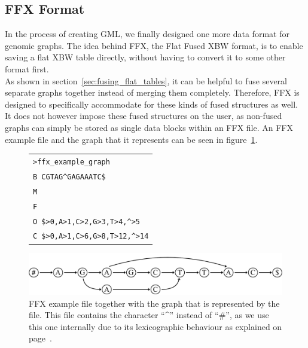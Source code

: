 \documentclass[a4paper,12pt,twoside,BCOR=10mm]{scrbook}
\begin{document}
\subsection{FFX Format}

In the process of creating GML, we finally designed one more data format for
genomic graphs. The idea behind FFX, the Flat Fused XBW format, is to enable saving
a flat XBW table directly, without having to convert it to some other format
first. \\
As shown in section~\ref{sec:fusing_flat_tables},
it can be helpful to fuse several separate graphs together
instead of merging them completely. Therefore, FFX is designed
to specifically accommodate for these kinds of fused structures as well.
It does not however impose these fused structures on the user,
as non-fused graphs can simply be stored as single data blocks within
an FFX file.
An FFX example file and the graph that it represents can be seen in figure~\ref{fig:evo_fig_ffx_example}.

\begin{figure}[!htb]
\centering
\begin{tabularx}{1.0\textwidth}{ | X | }
\hline
\texttt{>ffx\_example\_graph} \\
\texttt{B \quad CGTAG{\textasciicircum}GAGAAATC\$} \\
\texttt{M \quad 111111111001111} \\
\texttt{F \quad 111011111011111} \\
\texttt{O \quad \$>0,A>1,C>2,G>3,T>4,{\textasciicircum}>5} \\
\texttt{C \quad \$>0,A>1,C>6,G>8,T>12,{\textasciicircum}>14} \\
\hline
\end{tabularx}
\includegraphics[width=\textwidth]{evo_fig_ffx_example.pdf}
\caption[FFX example file]{FFX example file together with the graph that is represented by the file. This file contains the character “{\textasciicircum}” instead of “$\#$”, as we use this one internally due to its lexicographic behaviour as explained on page~\pageref{hat_instead_of_hashtag}.} \label{fig:evo_fig_ffx_example}
\end{figure}
\end{document}
